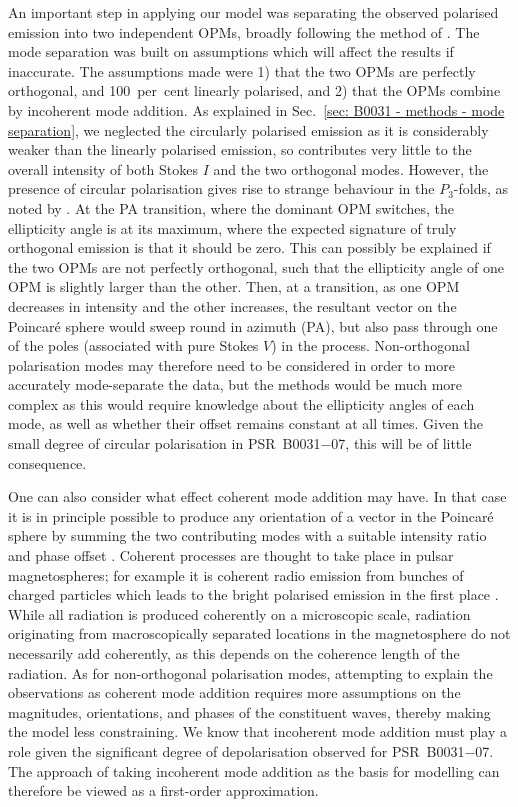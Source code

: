 An important step in applying our model was separating the observed polarised emission into two independent OPMs, broadly following the method of \citet{MSxx2000}. The mode separation was built on assumptions which will affect the results if inaccurate. The assumptions made were 1) that the two OPMs are perfectly orthogonal, and 100~per~cent linearly polarised, and 2) that the OPMs combine by incoherent mode addition. As explained in Sec.~\ref{sec: B0031 - methods - mode separation}, we neglected the circularly polarised emission as it is considerably weaker than the linearly polarised emission, so contributes very little to the overall intensity of both Stokes $I$ and the two orthogonal modes. However, the presence of circular polarisation gives rise to strange behaviour in the $P_3$-folds, as noted by \citet{IWJ+2020}. At the PA transition, where the dominant OPM switches, the ellipticity angle is at its maximum, where the expected signature of truly orthogonal emission is that it should be zero. This can possibly be explained if the two OPMs are not perfectly orthogonal, such that the ellipticity angle of one OPM is slightly larger than the other. Then, at a transition, as one OPM decreases in intensity and the other increases, the resultant vector on the Poincar\'e sphere would sweep round in azimuth (PA), but also pass through one of the poles (associated with pure Stokes $V$) in the process. Non-orthogonal polarisation modes may therefore need to be considered in order to more accurately mode-separate the data, but the methods would be much more complex as this would require knowledge about the ellipticity angles of each mode, as well as whether their offset remains constant at all times. Given the small degree of circular polarisation in PSR~B0031$-$07, this will be of little consequence.


One can also consider what effect coherent mode addition may have. In that case it is in principle possible to produce any orientation of a vector in the Poincar\'e sphere by summing the two contributing modes with a suitable intensity ratio and phase offset \citep[e.g.][]{Dxxx2017}. Coherent processes are thought to take place in pulsar magnetospheres; for example it is coherent radio emission from bunches of charged particles which leads to the bright polarised emission in the first place \citep{RSxx1975}. While all radiation is produced coherently on a microscopic scale, radiation originating from macroscopically separated locations in the magnetosphere do not necessarily add coherently, as this depends on the coherence length of the radiation. As for non-orthogonal polarisation modes, attempting to explain the observations as coherent mode addition requires more assumptions on the magnitudes, orientations, and phases of the constituent waves, thereby making the model less constraining. We know that incoherent mode addition must play a role given the significant degree of depolarisation observed for PSR~B0031$-$07. The approach of taking incoherent mode addition as the basis for modelling can therefore be viewed as a first-order approximation. 

